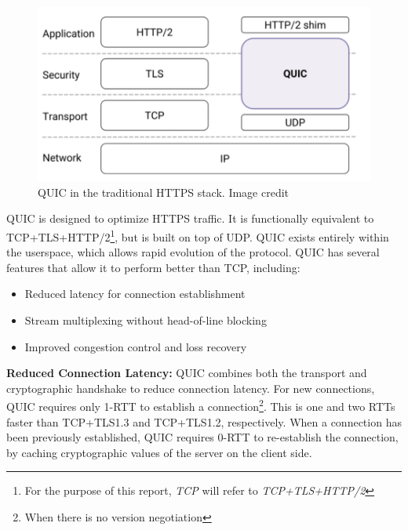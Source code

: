 \documentclass[12pt]{article}
\begin{document}
\begin{figure}
\centering
\includegraphics[scale=.25]{images/quic_stack.png}
\caption{QUIC in the traditional HTTPS stack. Image credit \cite{Langley:2017:QTP:3098822.3098842}}
\label{fig:quic_stack}
\end{figure}

QUIC is designed to optimize HTTPS traffic. It is functionally equivalent to TCP+TLS+HTTP/2\footnote{For the purpose of this report, \emph{TCP} will refer to \emph{TCP+TLS+HTTP/2}}, but is built on top of UDP. QUIC exists entirely within the userspace, which allows rapid evolution of the protocol. QUIC has several features that allow it to perform better than TCP, including:
\begin{itemize}
	\item Reduced latency for connection establishment
	\item Stream multiplexing without head-of-line blocking
	\item Improved congestion control and loss recovery
\end{itemize}

\textbf{Reduced Connection Latency:} QUIC combines both the transport and cryptographic handshake to reduce connection latency. For new connections, QUIC requires only 1-RTT to establish a connection\footnote{When there is no version negotiation}. This is one and two RTTs faster than TCP+TLS1.3 and TCP+TLS1.2, respectively\cite{7867726}. When a connection has been previously established, QUIC requires 0-RTT to re-establish the connection, by caching cryptographic values of the server on the client side.
\end{document}
